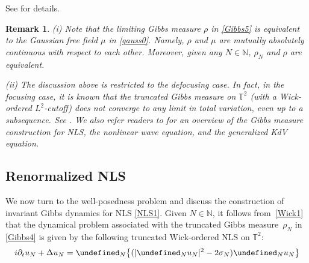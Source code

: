 \documentclass[%
11pt,  reqno]{amsart}
\newtheorem{remark}[theorem]{Remark}
\newcommand{\1}{\hspace{0.2mm}\text{I}\hspace{0.2mm}}
\newcommand{\noi}{\noindent}
\newcommand{\T}{\mathbb{T}}
\let\P= \undefined
\newcommand{\P}{\mathbf{P}}
\newcommand{\s}{\sigma}
\newcommand{\dt}{\partial_t}
\newcommand{\N}{\mathbb{N}}
\numberwithin{equation}{section}
\numberwithin{theorem}{section}
\DeclareMathOperator{\Law}{Law}
\begin{document}
\noi
See \cite[Section 2]{OTh1}
for details.


\begin{remark}\label{REM:1} \rm
(i) Note that the limiting Gibbs measure $\rho$ in \eqref{Gibbs5}
is equivalent to the Gaussian free field $\mu$
in \eqref{gauss0}.  Namely, $\rho$ and $\mu$
are mutually absolutely continuous
with respect to each other.
Moreover, given any $N \in \N$, 
$\rho_N$ and $\rho$ are equivalent.


\smallskip

\noi
(ii)
The discussion above is restricted to the defocusing case.
In fact, in the focusing case, 
it is known that the truncated Gibbs measure on $\T^2$
(with a Wick-ordered $L^2$-cutoff)
does not converge   to any  limit in total variation, even up to a subsequence.
See \cite{BS, OST2, GOTT}.
We also refer
readers to 
\cite{OST1, OOT2}
for an overview of the Gibbs measure construction
for NLS, the nonlinear wave equation, and the generalized KdV equation.






\end{remark}
	






\subsection{Renormalized NLS} %





We now turn to the well-posedness problem
and discuss the construction of invariant Gibbs dynamics for NLS \eqref{NLS1}.
Given $N \in \N$, it follows from~\eqref{Wick1} 
that the dynamical problem
associated with the truncated Gibbs measure~$\rho_N$ in \eqref{Gibbs4}
is given by the following truncated Wick-ordered NLS on $\T^2$:
\begin{align}
i \dt u_N +  \Delta u _N=  \P_N\big\{ ( |\P_N u_N|^{2}  - 2\s_N)  \P_N u_N\big\}
\label{NLS1a}
\end{align}
\end{document}
